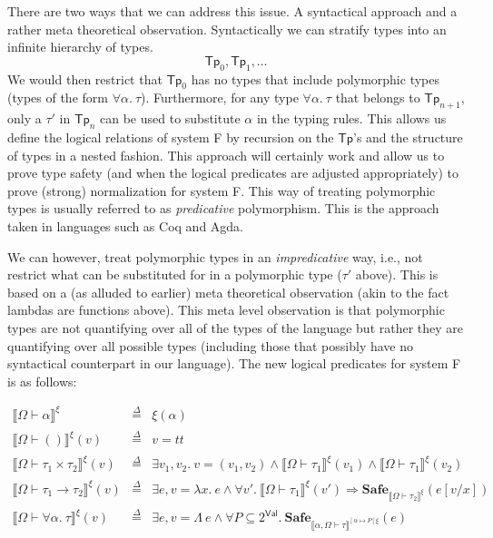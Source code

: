 \documentclass{article}
\newcommand{\TT}{\mathit{tt}}
\newcommand{\VAL}{\mathsf{Val}}
\newcommand{\UNT}{()}
\newcommand{\defeq}{\overset{\Delta}{=}}
\newcommand{\semtyp}[2]{\llbracket #2 \rrbracket_{#1}}
\begin{document}
There are two ways that we can address this issue.
A syntactical approach and a rather meta theoretical observation.
Syntactically we can stratify types into an infinite hierarchy of types.
\[\mathsf{Tp}_0, \mathsf{Tp}_1, \dots\]
We would then restrict that $\mathsf{Tp}_0$ has no types that include polymorphic types (types of the form $\forall \alpha.~\tau$).
Furthermore, for any type $\forall \alpha.~\tau$ that belongs to
$\mathsf{Tp}_{n+1}$, only a $\tau'$ in $\mathsf{Tp}_n$ can be
used to substitute $\alpha$ in the typing rules.
This allows us define the logical relations of system F by recursion on the $\mathsf{Tp}$'s and the structure of types in a
nested fashion.
This approach will certainly work and allow us to prove type safety (and when the logical predicates are adjusted
appropriately) to prove (strong) normalization for system F.
This way of treating polymorphic types is usually referred to
as \emph{predicative} polymorphism.
This is the approach taken in languages such as Coq and Agda.

We can however, treat polymorphic types in an
\emph{impredicative} way, i.e., not restrict what can be
substituted for in a polymorphic type ($\tau'$ above).
This is based on a (as alluded to earlier) meta theoretical
observation (akin to the fact lambdas are functions above).
This meta level observation is that polymorphic types are
not quantifying over all of the types of the language but rather
they are quantifying over all possible types (including those that possibly have no syntactical counterpart in our language).
The new logical predicates for system F is as follows:

\[
\begin{array}{lll}
\semtyp{}{\Omega \vdash \alpha}^{\xi} &\defeq& \xi(\alpha)\\
\semtyp{}{\Omega \vdash \UNT}^{\xi}(v) &\defeq& v = \TT\\
\semtyp{}{\Omega \vdash \tau_1 \times \tau_2}^{\xi}(v) &\defeq& \exists v_1, v_2.~v = (v_1, v_2) \land
\semtyp{}{\Omega \vdash \tau_1}^{\xi}(v_1) \land \semtyp{}{\Omega \vdash \tau_1}^{\xi}(v_2)\\
\semtyp{}{\Omega \vdash \tau_1 \to \tau_2}^{\xi}(v) &\defeq& \exists e, v = \lambda x.~e\land
\forall v'.~\semtyp{}{\Omega \vdash \tau_1}^{\xi}(v') \Rightarrow \mathbf{Safe}_{\semtyp{}{\Omega \vdash \tau_2}^{\xi}}(e[v/x])\\
\semtyp{}{\Omega \vdash \forall \alpha.~\tau}^{\xi}(v) &\defeq& \exists e, v = \Lambda~e\land
\forall P \subseteq 2^{\VAL}.~\mathbf{Safe}_{\semtyp{}{\alpha, \Omega \vdash \tau}^{[\alpha \mapsto P]\xi}}(e)
\end{array}
\]
\end{document}
